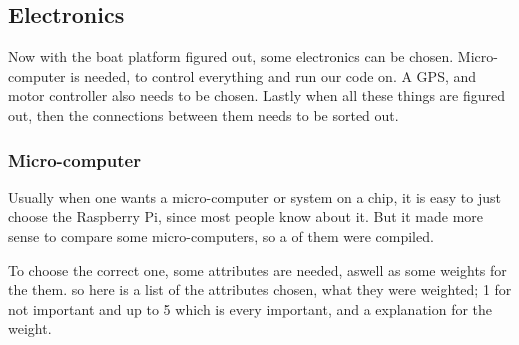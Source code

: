 \subsection{Electronics}
Now with the boat platform figured out, some electronics can be chosen. Micro-computer is needed, to control everything and run our code on. A GPS, and motor controller also needs to be chosen. Lastly when all these things are figured out, then the connections between them needs to be sorted out.

\subsubsection{Micro-computer}
Usually when one wants a micro-computer or system on a chip, it is easy to just choose the Raspberry Pi, since most people know about it. But it made more sense to compare some micro-computers, so a of them were compiled. 

To choose the correct one, some attributes are needed, aswell as some weights for the them. so here is a list of the attributes chosen, what they were weighted; 1 for not important and up to 5 which is every important, and a explanation for the weight.

